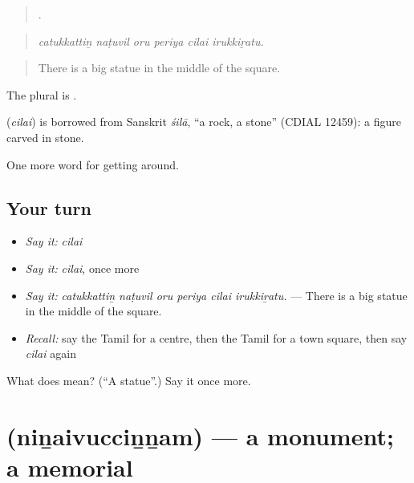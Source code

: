 \begin{quote}
     .
\end{quote}

\begin{quote}
\emph{catukkattiṉ naṭuvil oru periya cilai irukkiṟatu.}
\end{quote}

\begin{quote}
There is a big statue in the middle of the square.
\end{quote}

The plural is .

\begin{cousinweb}
\textbf{} (\emph{cilai}) is borrowed from Sanskrit \emph{śilā}, \textquotedblleft{}a rock, a stone\textquotedblright{} (CDIAL 12459): a figure carved in stone.
\end{cousinweb}

\begin{grammarlens}[title={What you've built}]
One more word for getting around.
\end{grammarlens}

\subsection*{Your turn}
\begin{itemize}
\raggedright
  \item \emph{Say it:} \emph{cilai}
  \item \emph{Say it:} \emph{cilai}, once more
  \item \emph{Say it:} \emph{catukkattiṉ naṭuvil oru periya cilai irukkiṟatu.} — There is a big statue in the middle of the square.
  \item \emph{Recall:} say the Tamil for a centre, then the Tamil for a town square, then say \emph{cilai} again
\end{itemize}

\begin{tcolorbox}[breakable,colback=teal!4,colframe=teal!35!black,title={Before you move on}]
What does  mean? (\textquotedblleft{}A statue\textquotedblright{}.) Say it once more.
\end{tcolorbox}
\section[\texorpdfstring{\ta{நினைவுச்சின்னம்} (niṉaivucciṉṉam)}{நினைவுச்சின்னம் (niṉaivucciṉṉam)}]{ (niṉaivucciṉṉam) — a monument; a memorial}

